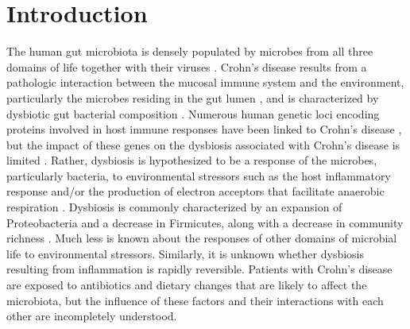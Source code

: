 \section{Introduction}
The human gut microbiota is densely populated by microbes from all three domains of life together with their viruses \citep{Hoffmann:2013gu,Consortium:2012tm,Minot:2011ez}. Crohn's disease results from a pathologic interaction between the mucosal immune system and the environment, particularly the microbes residing in the gut lumen \citep{Sartor, Sartor:2008cs}, and is characterized by dysbiotic gut bacterial composition \citep{Huttenhower:2014ba, Khor:2011ky, Sartor, Sartor:2008cs}. Numerous human genetic loci encoding proteins involved in host immune responses have been linked to Crohn's disease \citep{Jostins:2012iu}, but the impact of these genes on the dysbiosis associated with Crohn's disease is limited \citep{Knights:2014jta}. Rather, dysbiosis is hypothesized to be a response of the microbes, particularly bacteria, to environmental stressors such as the host inflammatory response \citep{Huttenhower:2014ba} and/or the production of electron acceptors that facilitate anaerobic respiration \citep{Winter:2014ed}. Dysbiosis is commonly characterized by an expansion of Proteobacteria and a decrease in Firmicutes, along with a decrease in community richness \citep{nagalingam2012role}. Much less is known about the responses of other domains of microbial life to environmental stressors. Similarly, it is unknown whether dysbiosis resulting from inflammation is rapidly reversible. Patients with Crohn's disease are exposed to antibiotics and dietary changes that are likely to affect the microbiota, but the influence of these factors and their interactions with each other are incompletely understood. 

